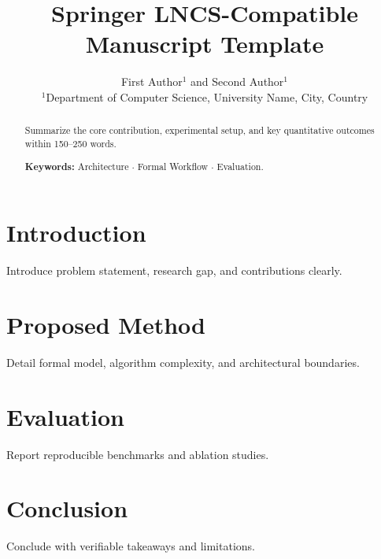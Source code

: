 \documentclass[10pt,a4paper]{article}
\title{\Large\bfseries Springer LNCS-Compatible Manuscript Template}
\author{First Author$^{1}$ and Second Author$^{1}$ \\
\small $^{1}$Department of Computer Science, University Name, City, Country}
\date{}
\begin{document}
\maketitle

\begin{abstract}
\noindent Summarize the core contribution, experimental setup, and key quantitative outcomes within 150--250 words.

\medskip
\noindent\textbf{Keywords:} Architecture $\cdot$ Formal Workflow $\cdot$ Evaluation.
\end{abstract}

\section{Introduction}
Introduce problem statement, research gap, and contributions clearly.

\section{Proposed Method}
Detail formal model, algorithm complexity, and architectural boundaries.

\section{Evaluation}
Report reproducible benchmarks and ablation studies.

\section{Conclusion}
Conclude with verifiable takeaways and limitations.
\end{document}
